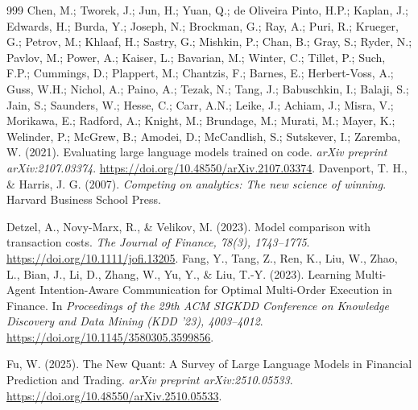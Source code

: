 \documentclass[analytics,article,submit,pdftex,moreauthors]{Definitions/mdpi}
\begin{document}
\begin{thebibliography}{999}
 Chen, M.; Tworek, J.; Jun, H.; Yuan, Q.; de Oliveira Pinto, H.P.; Kaplan, J.; Edwards, H.; Burda, Y.; Joseph, N.; Brockman, G.; Ray, A.; Puri, R.; Krueger, G.; Petrov, M.; Khlaaf, H.; Sastry, G.; Mishkin, P.; Chan, B.; Gray, S.; Ryder, N.; Pavlov, M.; Power, A.; Kaiser, L.; Bavarian, M.; Winter, C.; Tillet, P.; Such, F.P.; Cummings, D.; Plappert, M.; Chantzis, F.; Barnes, E.; Herbert-Voss, A.; Guss, W.H.; Nichol, A.; Paino, A.; Tezak, N.; Tang, J.; Babuschkin, I.; Balaji, S.; Jain, S.; Saunders, W.; Hesse, C.; Carr, A.N.; Leike, J.; Achiam, J.; Misra, V.; Morikawa, E.; Radford, A.; Knight, M.; Brundage, M.; Murati, M.; Mayer, K.; Welinder, P.; McGrew, B.; Amodei, D.; McCandlish, S.; Sutskever, I.; Zaremba, W. (2021). Evaluating large language models trained on code. \emph{arXiv preprint arXiv:2107.03374}. \url{https://doi.org/10.48550/arXiv.2107.03374}.
 Davenport, T. H., \& Harris, J. G. (2007). \emph{Competing on analytics: The new science of winning}. Harvard Business School Press.

 Detzel, A., Novy-Marx, R., \& Velikov, M. (2023). Model comparison with transaction costs. \emph{The Journal of Finance, 78(3), 1743--1775}. \url{https://doi.org/10.1111/jofi.13205}.
 Fang, Y., Tang, Z., Ren, K., Liu, W., Zhao, L., Bian, J., Li, D., Zhang, W., Yu, Y., \& Liu, T.-Y. (2023). Learning Multi-Agent Intention-Aware Communication for Optimal Multi-Order Execution in Finance. In \emph{Proceedings of the 29th ACM SIGKDD Conference on Knowledge Discovery and Data Mining (KDD '23), 4003--4012}. \url{https://doi.org/10.1145/3580305.3599856}.

 Fu, W. (2025). The New Quant: A Survey of Large Language Models in Financial Prediction and Trading. \emph{arXiv preprint arXiv:2510.05533}. \url{https://doi.org/10.48550/arXiv.2510.05533}.


\end{thebibliography}
\end{document}

